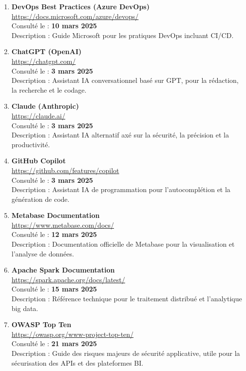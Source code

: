 \begin{enumerate}
    \item \textbf{DevOps Best Practices (Azure DevOps)} \\
    \url{https://docs.microsoft.com/azure/devops/} \\
    Consulté le : \textbf{10 mars 2025} \\
    Description : Guide Microsoft pour les pratiques DevOps incluant CI/CD.

    \item \textbf{ChatGPT (OpenAI)} \\
    \url{https://chatgpt.com/} \\
    Consulté le : \textbf{3 mars 2025} \\
    Description : Assistant IA conversationnel basé sur GPT, pour la rédaction, la recherche et le codage.

    \item \textbf{Claude (Anthropic)} \\
    \url{https://claude.ai/} \\
    Consulté le : \textbf{3 mars 2025} \\
    Description : Assistant IA alternatif axé sur la sécurité, la précision et la productivité.

    \item \textbf{GitHub Copilot} \\
    \url{https://github.com/features/copilot} \\
    Consulté le : \textbf{3 mars 2025} \\
    Description : Assistant IA de programmation pour l’autocomplétion et la génération de code.

    \item \textbf{Metabase Documentation} \\
    \url{https://www.metabase.com/docs/} \\
    Consulté le : \textbf{12 mars 2025} \\
    Description : Documentation officielle de Metabase pour la visualisation et l’analyse de données.

    \item \textbf{Apache Spark Documentation} \\
    \url{https://spark.apache.org/docs/latest/} \\
    Consulté le : \textbf{15 mars 2025} \\
    Description : Référence technique pour le traitement distribué et l’analytique big data.

    \item \textbf{OWASP Top Ten} \\
    \url{https://owasp.org/www-project-top-ten/} \\
    Consulté le : \textbf{21 mars 2025} \\
    Description : Guide des risques majeurs de sécurité applicative, utile pour la sécurisation des APIs et des plateformes BI.


\end{enumerate}
